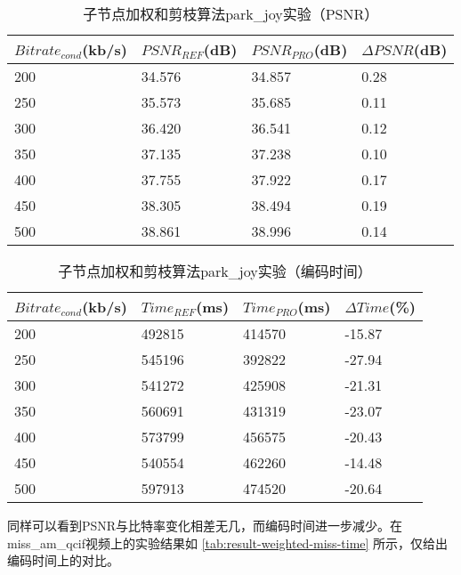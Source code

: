 \begin{table}[H]
  \centering
    \caption{子节点加权和剪枝算法park\_joy实验（PSNR）}
    \label{tab:result-weighted-park-psnr}
    \begin{tabularx}{\linewidth}{XXXX}
      \toprule[1.5pt]
      $Bitrate_{cond}$(kb/s) & $PSNR_{REF}$(dB) & $PSNR_{PRO}$(dB) & $\Delta PSNR$(dB) \\
      \midrule[1pt]
      200 & 34.576 & 34.857 & 0.28  \\
      250 & 35.573 & 35.685 & 0.11 \\
      300 & 36.420 & 36.541 & 0.12  \\
      350 & 37.135 & 37.238 & 0.10 \\
      400 & 37.755 & 37.922 & 0.17  \\
      450 & 38.305 & 38.494 & 0.19 \\
      500 & 38.861 & 38.996 & 0.14  \\
      \bottomrule[1.5pt]
    \end{tabularx}
\end{table}

\begin{table}[H]
  \centering
    \caption{子节点加权和剪枝算法park\_joy实验（编码时间）}
    \label{tab:result-weighted-park-time}
    \begin{tabularx}{\linewidth}{XXXX}
      \toprule[1.5pt]
      $Bitrate_{cond}$(kb/s) & $Time_{REF}$(ms) & $Time_{PRO}$(ms) & $\Delta Time$(\%) \\
      \midrule[1pt]
      200 & 492815 & 414570 & -15.87  \\
      250 & 545196 & 392822 & -27.94 \\
      300 & 541272 & 425908 & -21.31  \\
      350 & 560691 & 431319 & -23.07 \\
      400 & 573799 & 456575 & -20.43  \\
      450 & 540554 & 462260 & -14.48 \\
      500 & 597913 & 474520 & -20.64  \\
      \bottomrule[1.5pt]
    \end{tabularx}
\end{table}

同样可以看到PSNR与比特率变化相差无几，而编码时间进一步减少。在miss\_am\_qcif视频上的实验结果如
\ref{tab:result-weighted-miss-time} 所示，仅给出编码时间上的对比。

